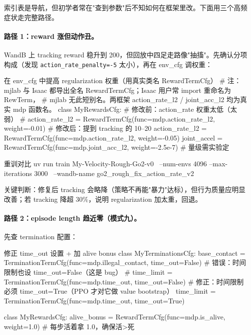 索引表是导航，但初学者常在"查到参数"后不知如何在框架里改。下面用三个高频症状走完整路径。

\paragraph{路径 1：reward 涨但动作丑。}WandB 上 tracking reward 稳升到 200，但回放中四足走路像"抽搐"。先确认分项构成（发现 \verb|action_rate_penalty=-5| 太小），再在 env\_cfg 调权重：

\begin{codebox}[Python]{在 env\_cfg 中提高 regularization 权重（用真实类名 RewardTermCfg）}
# 注：mjlab 与 Isaac 都导出全名 RewardTermCfg；Isaac 用户常 import 重命名为 RewTerm，
#     mjlab 无此短别名。两框架 action_rate_l2 / joint_acc_l2 均为真实 mdp 函数名。
class MyRewardsCfg:
    # 修改前：action_rate 权重太低（太弱）
    # action_rate_l2 = RewardTermCfg(func=mdp.action_rate_l2, weight=-0.01)
    # 修改后：提到 tracking 的 10--20%
    action_rate_l2 = RewardTermCfg(func=mdp.action_rate_l2, weight=-0.05)
    joint_accel    = RewardTermCfg(func=mdp.joint_acc_l2,   weight=-2.5e-7)  # 量级需实验定
\end{codebox}

\begin{codebox}[bash]{重训对比}
uv run train My-Velocity-Rough-Go2-v0 \
  --num-envs 4096 --max-iterations 3000 \
  --wandb-name go2_rough_fix_action_rate_v2
\end{codebox}

关键判断：修复后 tracking 会略降（策略不再能"暴力"达标），但行为质量应明显改善；若 tracking 降超 30\%，说明 regularization 加太重，回退。

\paragraph{路径 2：episode length 趋近零（模式九）。}先查 termination 配置：

\begin{codebox}[Python]{修正 time\_out 设置 + 加 alive bonus}
class MyTerminationsCfg:
    base_contact = TerminationTermCfg(func=mdp.illegal_contact, time_out=False)
    # 错误：时间限制也设 time_out=False（这是 bug）
    # time_limit = TerminationTermCfg(func=mdp.time_out, time_out=False)
    # 修正：时间限制必须 time_out=True（PPO 才对它做 value bootstrap）
    time_limit   = TerminationTermCfg(func=mdp.time_out, time_out=True)

class MyRewardsCfg:
    alive_bonus = RewardTermCfg(func=mdp.is_alive, weight=1.0)  # 每步活着拿 1.0，确保活>死
\end{codebox}


